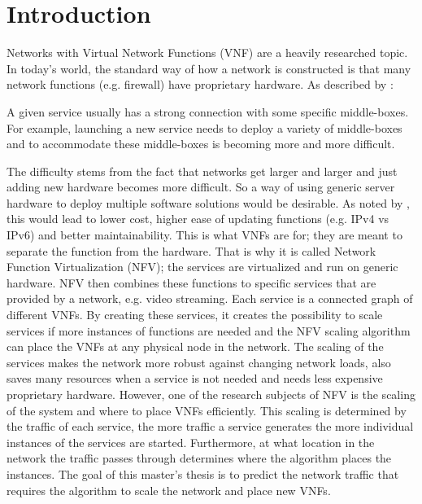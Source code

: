 \section{Introduction}
        Networks with Virtual Network Functions (VNF) are a heavily researched topic.        
        In today's world, the standard way of how a network is constructed is that many network functions (e.g. firewall) have proprietary hardware.
        As described by \cite{YI2018212}:
        \begin{displayquote}
            A given service usually has a strong connection with some specific middle-boxes. For example, launching a new service needs to deploy a variety of middle-boxes and to accommodate these middle-boxes is becoming more and more difficult.
        \end{displayquote}
        The difficulty stems from the fact that networks get larger and larger and just adding new hardware becomes more difficult.
        So a way of using generic server hardware to deploy multiple software solutions would be desirable.
        As noted by \cite{YI2018212}, this would lead to lower cost, higher ease of updating functions (e.g. IPv4 vs IPv6) and better maintainability.
        This is what VNFs are for; they are meant to separate the function from the hardware.
        That is why it is called Network Function Virtualization (NFV); the services are virtualized and run on generic hardware.
        NFV then combines these functions to specific services that are provided by a network, e.g. video streaming.
        Each service is a connected graph of different VNFs.
        By creating these services, it creates the possibility to scale services if more instances of functions are needed and the NFV scaling algorithm can place the VNFs at any physical node in the network.
        The scaling of the services makes the network more robust against changing network loads, also saves many resources when a service is not needed and needs less expensive proprietary hardware.     
        However, one of the research subjects of NFV is the scaling of the system and where to place VNFs efficiently.
        This scaling is determined by the traffic of each service, the more traffic a service generates the more individual instances of the services are started.
        Furthermore, at what location in the network the traffic passes through determines where the algorithm places the instances.
        The goal of this master's thesis is to predict the network traffic that requires the algorithm to scale the network and place new VNFs.
        
